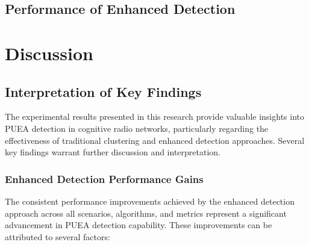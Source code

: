 
\section{Performance of Enhanced Detection}



\chapter{Discussion}

\section{Interpretation of Key Findings}

The experimental results presented in this research provide valuable insights into PUEA detection in cognitive radio networks, particularly regarding the effectiveness of traditional clustering and enhanced detection approaches. Several key findings warrant further discussion and interpretation.

\subsection{Enhanced Detection Performance Gains}

The consistent performance improvements achieved by the enhanced detection approach across all scenarios, algorithms, and metrics represent a significant advancement in PUEA detection capability. These improvements can be attributed to several factors:

